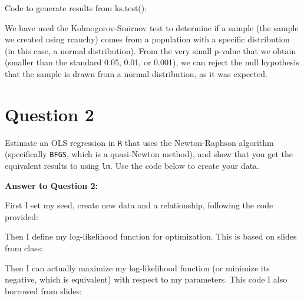 \documentclass[12pt,letterpaper]{article}
\begin{document}
\noindent Code to generate results from ks.test(): 

\vspace{.1in}
 
 \vspace{.1in}
 
\noindent We have used the Kolmogorov-Smirnov test to determine if a sample (the sample we created using rcauchy) comes from a population with a specific distribution (in this case, a normal distribution). 
\noindent From the very small p-value that we obtain (smaller than the standard 0.05, 0.01, or 0.001), we can reject the null hypothesis that the sample is drawn from a normal distribution, as it was expected. 


\newpage
\section*{Question 2}
\noindent Estimate an OLS regression in \texttt{R} that uses the Newton-Raphson algorithm (specifically \texttt{BFGS}, which is a quasi-Newton method), and show that you get the equivalent results to using \texttt{lm}. Use the code below to create your data.
\vspace{.5cm}
 

\vspace{.2in}

\noindent \textbf{Answer to Question 2:}

\vspace{.1in}

\noindent First I set my seed, create new data and a relationship, following the code provided: 

\vspace{.1in}

\vspace{.1in}

\noindent Then I define my log-likelihood function for optimization. This is based on slides from class: 

\vspace{.1in}

\vspace{.1in}

\noindent Then I can actually maximize my log-likelihood function (or minimize its negative, which is equivalent) with respect to my parameters. This code I also borrowed from slides: 

\vspace{.1in}

\vspace{.1in}
\end{document}
